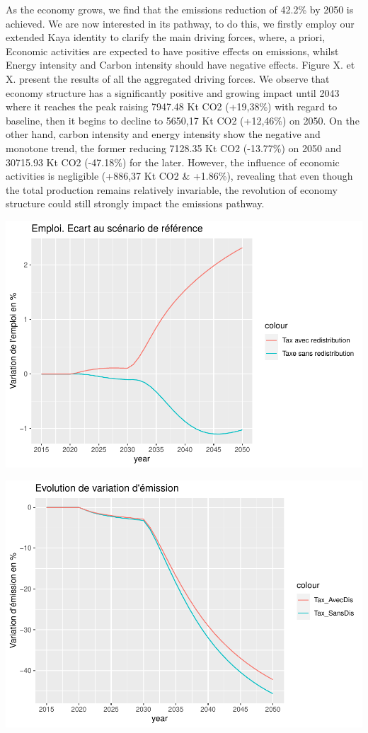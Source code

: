 \documentclass[
]{article}
\begin{document}
As the economy grows, we find that the emissions reduction of 42.2\% by
2050 is achieved. We are now interested in its pathway, to do this, we
firstly employ our extended Kaya identity to clarify the main driving
forces, where, a priori, Economic activities are expected to have
positive effects on emissions, whilst Energy intensity and Carbon
intensity should have negative effects. Figure X. et X. present the
results of all the aggregated driving forces. We observe that economy
structure has a significantly positive and growing impact until 2043
where it reaches the peak raising 7947.48 Kt CO2 (+19,38\%) with regard
to baseline, then it begins to decline to 5650,17 Kt CO2 (+12,46\%) on
2050. On the other hand, carbon intensity and energy intensity show the
negative and monotone trend, the former reducing 7128.35 Kt CO2
(-13.77\%) on 2050 and 30715.93 Kt CO2 (-47.18\%) for the later.
However, the influence of economic activities is negligible (+886,37 Kt
CO2 \& +1.86\%), revealing that even though the total production remains
relatively invariable, the revolution of economy structure could still
strongly impact the emissions pathway.

\includegraphics{Modele-ThreeMe-Tunisie_Sequeira_Valilou_Wang_files/figure-latex/unnamed-chunk-9-1.pdf}

\includegraphics{Modele-ThreeMe-Tunisie_Sequeira_Valilou_Wang_files/figure-latex/unnamed-chunk-10-1.pdf}
\end{document}
